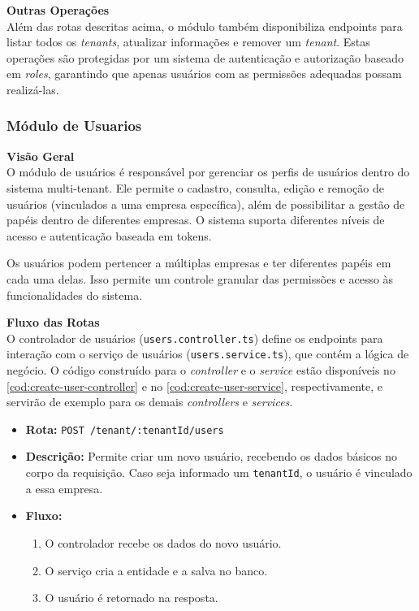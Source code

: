 \noindent\textbf{Outras Operações} \\
Além das rotas descritas acima, o módulo também disponibiliza endpoints para listar todos os \textit{tenants}, atualizar informações e remover um \textit{tenant}. Estas operações são protegidas por um sistema de autenticação e autorização baseado em \textit{roles}, garantindo que apenas usuários com as permissões adequadas possam realizá-las.

\subsubsection{Módulo de Usuarios}\label{subsubsec:modulo_usuarios}

\noindent\textbf{Visão Geral}\\
O módulo de usuários é responsável por gerenciar os perfis de usuários dentro do sistema multi-tenant. Ele permite o cadastro, consulta, edição e remoção de usuários (vinculados a uma empresa específica), além de possibilitar a gestão de papéis dentro de diferentes empresas. O sistema suporta diferentes níveis de acesso e autenticação baseada em tokens.

Os usuários podem pertencer a múltiplas empresas e ter diferentes papéis em cada uma delas. Isso permite um controle granular das permissões e acesso às funcionalidades do sistema.

\noindent\textbf{Fluxo das Rotas}\\
O controlador de usuários (\texttt{users.controller.ts}) define os endpoints para interação com o serviço de usuários (\texttt{users.service.ts}), que contém a lógica de negócio. O código construído para o \textit{controller} e  o \textit{service} estão disponíveis no \autoref{cod:create-user-controller} e  no \autoref{cod:create-user-service}, respectivamente, e servirão de exemplo para os demais \textit{controllers} e \textit{services}.

\begin{itemize}
	\item \textbf{Rota:} \texttt{POST /tenant/:tenantId/users}
	\item \textbf{Descrição:} Permite criar um novo usuário, recebendo os dados básicos no corpo da requisição. Caso seja informado um \texttt{tenantId}, o usuário é vinculado a essa empresa.
	\item \textbf{Fluxo:}
	\begin{enumerate}
		\item O controlador recebe os dados do novo usuário.
		\item O serviço cria a entidade e a salva no banco.
		\item O usuário é retornado na resposta.
	\end{enumerate}
\end{itemize}

